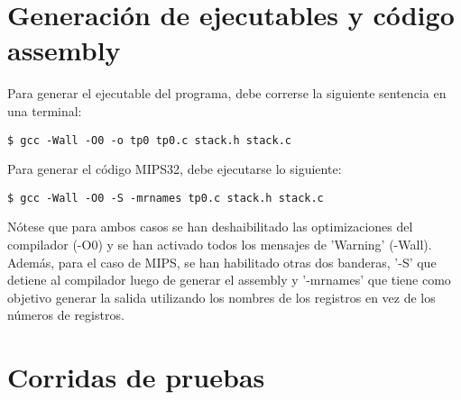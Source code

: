 \documentclass[a4paper,10pt]{article}
\begin{document}
\section{Generaci\'on de ejecutables y c\'odigo assembly}
Para generar el ejecutable del programa, debe correrse la siguiente sentencia en una terminal:
\begin{verbatim}
$ gcc -Wall -O0 -o tp0 tp0.c stack.h stack.c
\end{verbatim}

Para generar el c\'odigo MIPS32, debe ejecutarse lo siguiente:
\begin{verbatim}
$ gcc -Wall -O0 -S -mrnames tp0.c stack.h stack.c
\end{verbatim}

N\'otese que para ambos casos se han deshaibilitado las optimizaciones del compilador (-O0) y se han activado todos los mensajes de 'Warning' (-Wall). Adem\'as, para el caso de MIPS, se han habilitado otras dos banderas, '-S' que detiene al compilador luego de generar el assembly y '-mrnames' que tiene como objetivo generar la salida utilizando los nombres de los registros en vez de los n\'umeros de registros.
\pagebreak

\section{Corridas de pruebas}
\end{document}
